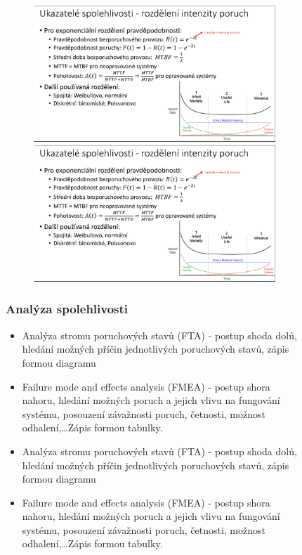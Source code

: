\begin{figure}[h]
\begin{figure}[h]
  \begin{center}
    \includegraphics[width = \textwidth]{img/Picture23.png}
  \end{center}
    \begin{center}
        \includegraphics[width = \textwidth]{img/Picture23.png}
    \end{center}
\end{figure}

\subsubsection*{Analýza spolehlivosti}
\begin{itemize}
  \item Analýza stromu poruchových stavů (FTA) - postup shoda dolů, hledání možných příčin jednotlivých poruchových stavů, zápis formou diagramu
  \item Failure mode and effects analysis (FMEA) - postup shora nahoru, hledání možných poruch a jejich vlivu na fungování systému, posouzení závažnosti poruch, četnosti, možnost odhalení,\dots Zápis formou tabulky.
    \item Analýza stromu poruchových stavů (FTA) - postup shoda dolů, hledání možných příčin jednotlivých poruchových stavů, zápis formou diagramu
    \item Failure mode and effects analysis (FMEA) - postup shora nahoru, hledání možných poruch a jejich vlivu na fungování systému, posouzení závažnosti poruch, četnosti, možnost odhalení,\dots Zápis formou tabulky.
\end{itemize}


\end{figure}
